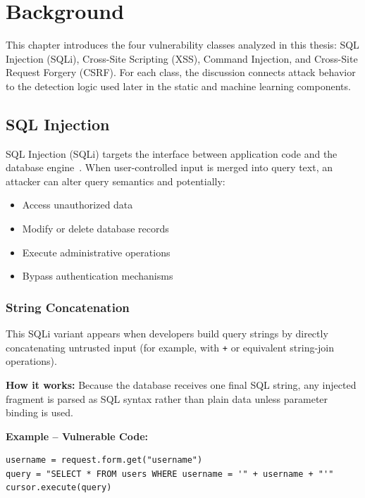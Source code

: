 \chapter{Background}
\label{ch:background}

This chapter introduces the four vulnerability classes analyzed in this thesis: SQL Injection (SQLi), Cross-Site Scripting (XSS), Command Injection, and Cross-Site Request Forgery (CSRF). For each class, the discussion connects attack behavior to the detection logic used later in the static and machine learning components.

\section{SQL Injection}
\label{sec:background_sqli}

SQL Injection (SQLi) targets the interface between application code and the database engine~\cite{OWASPTop10,OWASPSQLiCheatsheet,CWE89,Halfond2005AMNESIA}. When user-controlled input is merged into query text, an attacker can alter query semantics and potentially:
\begin{itemize}
	\item Access unauthorized data
	\item Modify or delete database records
	\item Execute administrative operations
	\item Bypass authentication mechanisms
\end{itemize}

\subsection{String Concatenation}
\label{sec:sqli_string_concat}

This SQLi variant appears when developers build query strings by directly concatenating untrusted input (for example, with \texttt{+} or equivalent string-join operations).

\textbf{How it works:} Because the database receives one final SQL string, any injected fragment is parsed as SQL syntax rather than plain data unless parameter binding is used.

\textbf{Example -- Vulnerable Code:}

\begin{lstlisting}[style=pycode]
username = request.form.get("username")
query = "SELECT * FROM users WHERE username = '" + username + "'"
cursor.execute(query)
\end{lstlisting}

